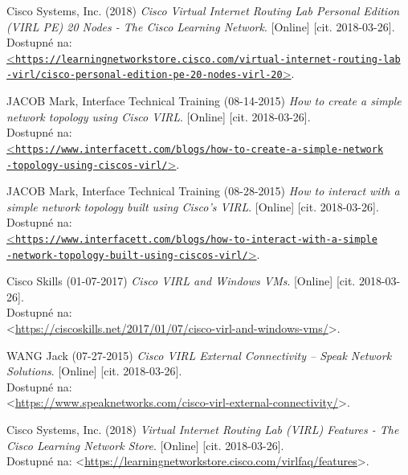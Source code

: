 \begin{thebibliography}{99}
Cisco Systems, Inc. (2018) {\it Cisco Virtual Internet Routing Lab Personal Edition (VIRL PE) 20 Nodes - The Cisco Learning Network}. [Online] [cit. 2018-03-26]. \\
Dostupné na: \\
\href{https://learningnetworkstore.cisco.com/virtual-internet-routing-lab-virl/cisco-personal-edition-pe-20-nodes-virl-20}{<\texttt{https://learningnetworkstore.cisco.com/virtual-internet-routing-lab\\-virl/cisco-personal-edition-pe-20-nodes-virl-20}>}.

JACOB Mark, Interface Technical Training (08-14-2015) {\it How to create a simple network topology using Cisco VIRL}. [Online] [cit. 2018-03-26]. \\
Dostupné na: \\
\href{https://www.interfacett.com/blogs/how-to-create-a-simple-network-topology-using-ciscos-virl/}{<\texttt{https://www.interfacett.com/blogs/how-to-create-a-simple-network\\-topology-using-ciscos-virl/}>}.

JACOB Mark, Interface Technical Training (08-28-2015) {\it How to interact with a simple network topology built using Cisco’s VIRL}. [Online] [cit. 2018-03-26]. \\
Dostupné na: \\
\href{https://www.interfacett.com/blogs/how-to-interact-with-a-simple-network-topology-built-using-ciscos-virl/}{<\texttt{https://www.interfacett.com/blogs/how-to-interact-with-a-simple\\-network-topology-built-using-ciscos-virl/}>}.

Cisco Skills (01-07-2017) {\it Cisco VIRL and Windows VMs}. [Online] [cit. 2018-03-26]. \\
Dostupné na: \\<\url{https://ciscoskills.net/2017/01/07/cisco-virl-and-windows-vms/}>.

WANG Jack (07-27-2015) {\it Cisco VIRL External Connectivity – Speak Network Solutions}. [Online] [cit. 2018-03-26]. \\
Dostupné na: \\<\url{https://www.speaknetworks.com/cisco-virl-external-connectivity/}>.

Cisco Systems, Inc. (2018) {\it Virtual Internet Routing Lab (VIRL) Features - The Cisco Learning Network Store}. [Online] [cit. 2018-03-26]. \\
Dostupné na: <\url{https://learningnetworkstore.cisco.com/virlfaq/features}>.


\end{thebibliography}
